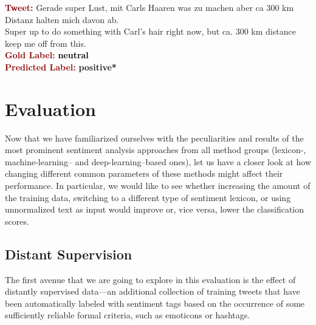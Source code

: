 \begin{example}\label{snt:cgsa:exmp:lba-error}
  \noindent\textup{\bfseries\textcolor{darkred}{Tweet:}} {\upshape
    \colorbox{green!0.5!blue!0.4}{Gerade} \colorbox{green!89}{super} \colorbox{blue!0.3}{Lust}, mit \colorbox{white!2}{Carls} Haaren \colorbox{white!0.6}{was} zu \colorbox{green!1}{machen} \colorbox{green!0.3}{aber} \colorbox{white!2}{ca} 300 \colorbox{white!1}{km}
    \colorbox{white!1}{Distanz} halten \colorbox{blue!0.3}{mich} davon \colorbox{white!1}{ab}.}\\
  \noindent\colorbox{green!89}{Super} \colorbox{blue!0.3}{up to}
  \colorbox{green!1}{do} \colorbox{white!0.6}{something} with
  \colorbox{white!2}{Carl}'s hair \colorbox{green!0.5!blue!0.4}{right
    now}, \colorbox{green!0.3}{but} \colorbox{white!2}{ca.} 300
  \colorbox{white!1}{km} \colorbox{white!1}{distance} keep
  \colorbox{blue!0.3}{me} \colorbox{white!1}{off} from
  this.\\[\exampleSep]
  \noindent\textup{\bfseries\textcolor{darkred}{Gold Label:}}\hspace*{4.3em}\textbf{%
    \upshape\textcolor{black}{neutral}}\\
 \noindent\textup{\bfseries\textcolor{darkred}{Predicted Label:}}\hspace*{2em}\textbf{%
    \upshape\textcolor{green3}{positive*}}
\end{example}


\section{Evaluation}

Now that we have familiarized ourselves with the peculiarities and
results of the most prominent sentiment analysis approaches from all
method groups (lexicon-, machine-learning-- and deep-learning--based
ones), let us have a closer look at how changing different common
parameters of these methods might affect their performance.  In
particular, we would like to see whether increasing the amount of the
training data, switching to a different type of sentiment lexicon, or
using unnormalized text as input would improve or, vice versa, lower
the classification scores.

\subsection{Distant Supervision}

The first avenue that we are going to explore in this evaluation is
the effect of distantly supervised data---an additional collection of
training tweets that have been automatically labeled with sentiment
tags based on the occurrence of some sufficiently reliable formal
criteria, such as emoticons or hashtags.

